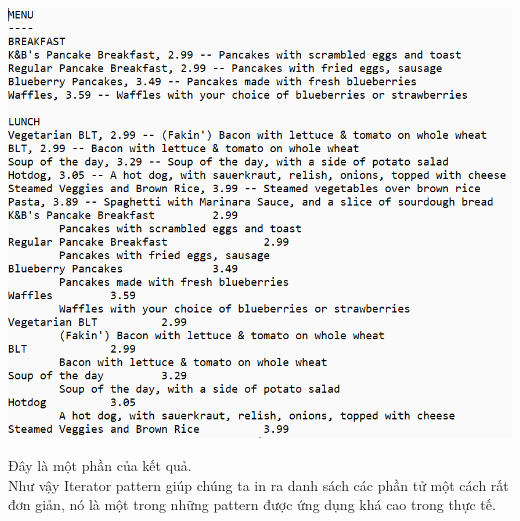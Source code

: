 \begin{center}
	\includegraphics[width=1\columnwidth,height=0.8\textheight]{GALLEYS/images/chapter3/images14}\\
\end{center}
Đây là một phần của kết quả.\\
Như vậy Iterator pattern giúp chúng ta in ra danh sách các phần tử một cách rất đơn giản, nó là một trong những pattern được ứng dụng khá cao trong thực tế.
